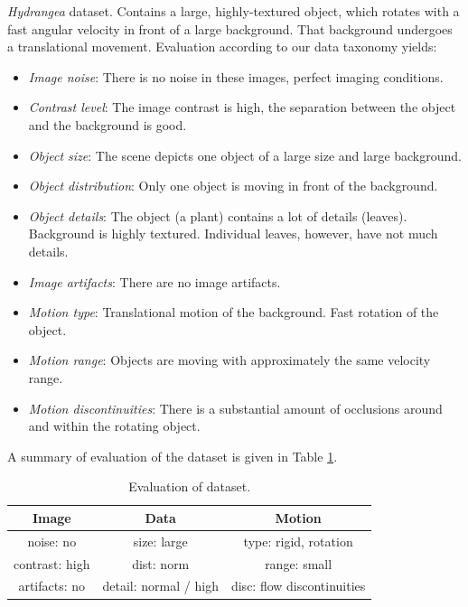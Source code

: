 \textit{Hydrangea} dataset. Contains a large, highly-textured object, which rotates with a fast angular velocity in front of a large background. That background undergoes a translational movement.
Evaluation according to our data taxonomy yields:
\begin{itemize}
	\item \textit{Image noise}: There is no noise in these images, perfect imaging conditions.
	
	\item \textit{Contrast level}:  The image contrast is high, the  separation between the object and the background is good.
	
	\item \textit{Object size}: The scene depicts one object of a large size and large background.
	
	\item \textit{Object distribution}: Only one object is moving in front of the background.
	
	\item \textit{Object details}: The object (a plant) contains a lot of details (leaves). Background is highly textured. Individual leaves, however, have not much details.
	
	\item \textit{Image artifacts}: There are no image  artifacts.
	
	\item \textit{Motion type}: Translational motion of the background. Fast rotation of the object. 
	
	\item \textit{Motion range}: Objects are moving with approximately the same velocity range.
	
	\item \textit{Motion discontinuities}: There is a substantial amount of occlusions around and within the rotating object.
\end{itemize}
A summary of evaluation of the \hyd dataset is given in Table \ref{tab:eval_hyd}.
\begin{table}[ht] \footnotesize
\centering
\caption{Evaluation of \hyd dataset.}
\begin{tabular}{ccc}
\toprule
\textbf{Image} & \textbf{Data}   & \textbf{Motion}   \\ 
\midrule
\cellcolor{good} noise: no      	    & \cellcolor{good} size: large  		& \cellcolor{good} type: rigid, rotation   \\ 
\cellcolor{good} contrast: high  	& \cellcolor{good} dist: norm     	& \cellcolor{good} range: small  \\ 
\cellcolor{good} artifacts: no       & \cellcolor{good} detail: normal / high 	&  \cellcolor{bad} disc: flow discontinuities   \\ 
\bottomrule
\end{tabular}
\label{tab:eval_hyd}%
\end{table}
